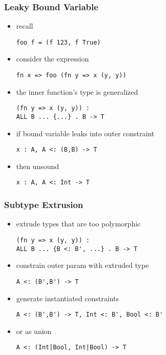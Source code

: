 \documentclass{beamer}
\begin{document}
\begin{frame}[fragile]
  \frametitle{Leaky Bound Variable}


  \begin{itemize}
  \item recall 
  \begin{lstlisting}
foo f = (f 123, f True)
  \end{lstlisting}
  \item consider the expression 
  \begin{lstlisting}
fn x => foo (fn y => x (y, y))
  \end{lstlisting}
  \item the inner function's type is generalized 
  \begin{lstlisting}
(fn y => x (y, y)) : 
ALL B ... {...} . B -> T
  \end{lstlisting}
  \item if bound variable leaks into outer constraint 
  \begin{lstlisting}
x : A, A <: (B,B) -> T
  \end{lstlisting}
  \item then unsound 
  \begin{lstlisting}
x : A, A <: Int -> T
  \end{lstlisting}
  \end{itemize}
\end{frame}

\begin{frame}[fragile]
  \frametitle{Subtype Extrusion}

  \begin{itemize}
  \item extrude types that are too polymorphic
  \begin{lstlisting}
(fn y => x (y, y)) : 
ALL B ... {B <: B', ...} . B -> T
  \end{lstlisting}
  \item constrain outer param with extruded type  
  \begin{lstlisting}
A <: (B',B') -> T
  \end{lstlisting}
  \item generate instantiated constraints 
  \begin{lstlisting}
A <: (B',B') -> T, Int <: B', Bool <: B' 
  \end{lstlisting}
  \item or as union 
  \begin{lstlisting}
A <: (Int|Bool, Int|Bool) -> T
  \end{lstlisting}
  \end{itemize}
\end{frame}
\end{document}
